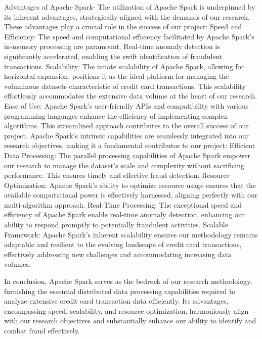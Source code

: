 \documentclass[journal]{IEEEtran}
\begin{document}
Advantages of Apache Spark- The utilization of Apache Spark is underpinned by its inherent advantages, strategically aligned with the demands of our research. These advantages play a crucial role in the success of our project:
Speed and Efficiency: The speed and computational efficiency facilitated by Apache Spark's in-memory processing are paramount. Real-time anomaly detection is significantly accelerated, enabling the swift identification of fraudulent transactions.
Scalability: The innate scalability of Apache Spark, allowing for horizontal expansion, positions it as the ideal platform for managing the voluminous datasets characteristic of credit card transactions. This scalability effortlessly accommodates the extensive data volume at the heart of our research.
Ease of Use: Apache Spark's user-friendly APIs and compatibility with various programming languages enhance the efficiency of implementing complex algorithms. This streamlined approach contributes to the overall success of our project.
Apache Spark's intrinsic capabilities are seamlessly integrated into our research objectives, making it a fundamental contributor to our project:
Efficient Data Processing: The parallel processing capabilities of Apache Spark empower our research to manage the dataset's scale and complexity without sacrificing performance. This ensures timely and effective fraud detection.
\newline
Resource Optimization: Apache Spark's ability to optimize resource usage ensures that the available computational power is effectively harnessed, aligning perfectly with our multi-algorithm approach.
\newline
Real-Time Processing: The exceptional speed and efficiency of Apache Spark enable real-time anomaly detection, enhancing our ability to respond promptly to potentially fraudulent activities.
\newline
Scalable Framework: Apache Spark's inherent scalability ensures our methodology remains adaptable and resilient to the evolving landscape of credit card transactions, effectively addressing new challenges and accommodating increasing data volumes.

In conclusion, Apache Spark serves as the bedrock of our research methodology, furnishing the essential distributed data processing capabilities required to analyze extensive credit card transaction data efficiently. Its advantages, encompassing speed, scalability, and resource optimization, harmoniously align with our research objectives and substantially enhance our ability to identify and combat fraud effectively.
\end{document}
